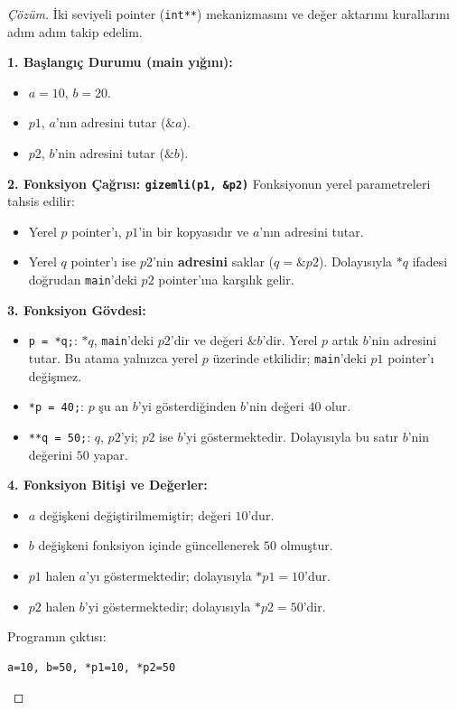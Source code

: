 \begin{proof}[Çözüm]
İki seviyeli pointer (\texttt{int**}) mekanizmasını ve değer aktarımı kurallarını adım adım takip edelim.

\textbf{1. Başlangıç Durumu (main yığını):}
\begin{itemize}
    \item $a = 10$, $b = 20$.
    \item $p1$, $a$'nın adresini tutar ($\&a$).
    \item $p2$, $b$'nin adresini tutar ($\&b$).
\end{itemize}

\textbf{2. Fonksiyon Çağrısı: \texttt{gizemli(p1, \&p2)}}
Fonksiyonun yerel parametreleri tahsis edilir:
\begin{itemize}
    \item Yerel $p$ pointer'ı, $p1$'in bir kopyasıdır ve $a$'nın adresini tutar.
    \item Yerel $q$ pointer'ı ise $p2$'nin \textbf{adresini} saklar ($q = \&p2$). Dolayısıyla $*q$ ifadesi doğrudan \texttt{main}'deki $p2$ pointer'ına karşılık gelir.
\end{itemize}

\textbf{3. Fonksiyon Gövdesi:}
\begin{itemize}
    \item \texttt{p = *q;}: 
    $*q$, \texttt{main}'deki $p2$'dir ve değeri $\&b$'dir. Yerel $p$ artık $b$'nin adresini tutar. Bu atama yalnızca yerel $p$ üzerinde etkilidir; \texttt{main}'deki $p1$ pointer'ı değişmez.
    \item \texttt{*p = 40;}: 
    $p$ şu an $b$'yi gösterdiğinden $b$'nin değeri $40$ olur.
    \item \texttt{**q = 50;}: 
    $q$, $p2$'yi; $p2$ ise $b$'yi göstermektedir. Dolayısıyla bu satır $b$'nin değerini $50$ yapar.
\end{itemize}

\textbf{4. Fonksiyon Bitişi ve Değerler:}
\begin{itemize}
    \item $a$ değişkeni değiştirilmemiştir; değeri $10$'dur.
    \item $b$ değişkeni fonksiyon içinde güncellenerek $50$ olmuştur.
    \item $p1$ halen $a$'yı göstermektedir; dolayısıyla $*p1 = 10$'dur.
    \item $p2$ halen $b$'yi göstermektedir; dolayısıyla $*p2 = 50$'dir.
\end{itemize}

Programın çıktısı:
\begin{lstlisting}[language=CTemel]
a=10, b=50, *p1=10, *p2=50
\end{lstlisting}
\end{proof}

